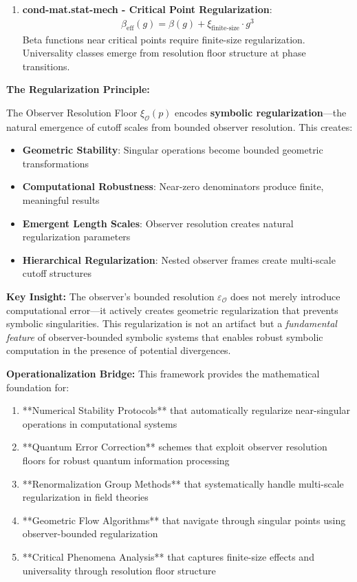 \begin{scholium}
\begin{enumerate}
\item \textbf{cond-mat.stat-mech - Critical Point Regularization}:
   \begin{align}
   \beta_{\text{eff}}(g) = \beta(g) + \xi_{\text{finite-size}} \cdot g^3
   \end{align}
   Beta functions near critical points require finite-size regularization. Universality classes emerge from resolution floor structure at phase transitions.
\end{enumerate}
\end{scholium}

\textbf{The Regularization Principle:}

The Observer Resolution Floor $\xi_{\mathcal{O}}(p)$ encodes \textbf{symbolic regularization}—the natural emergence of cutoff scales from bounded observer resolution. This creates:

\begin{itemize}
\item \textbf{Geometric Stability}: Singular operations become bounded geometric transformations
\item \textbf{Computational Robustness}: Near-zero denominators produce finite, meaningful results
\item \textbf{Emergent Length Scales}: Observer resolution creates natural regularization parameters
\item \textbf{Hierarchical Regularization}: Nested observer frames create multi-scale cutoff structures
\end{itemize}

\textbf{Key Insight:} The observer's bounded resolution $\varepsilon_{\mathcal{O}}$ does not merely introduce computational error—it actively creates geometric regularization that prevents symbolic singularities. This regularization is not an artifact but a \textit{fundamental feature} of observer-bounded symbolic systems that enables robust symbolic computation in the presence of potential divergences.

\textbf{Operationalization Bridge:}
This framework provides the mathematical foundation for:
\begin{enumerate}
\item **Numerical Stability Protocols** that automatically regularize near-singular operations in computational systems
\item **Quantum Error Correction** schemes that exploit observer resolution floors for robust quantum information processing
\item **Renormalization Group Methods** that systematically handle multi-scale regularization in field theories
\item **Geometric Flow Algorithms** that navigate through singular points using observer-bounded regularization
\item **Critical Phenomena Analysis** that captures finite-size effects and universality through resolution floor structure
\end{enumerate}

